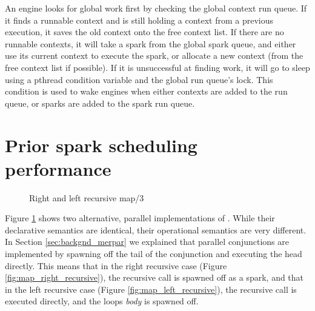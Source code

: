 An engine looks for global work first by checking the global context run queue.
If it finds a runnable context and is still holding a context from a
previous execution, it saves the old context onto the free context list.
If there are no runnable contexts,
it will take a spark from the global spark queue,
and either use its current context to execute the spark,
or allocate a new context (from the free context list if possible).
If it is unsuccessful at finding work,
it will go to sleep using a pthread condition variable and the global run
queue's lock.
This condition is used to wake engines when either contexts are added to the
run queue,
or sparks are added to the spark run queue.

\section{Prior spark scheduling performance}
\label{sec:old_scheduling_performance}


\begin{figure}
\begin{center}
%
\end{center}
\caption{Right and left recursive map/3}
\label{fig:map_right_and_left_recursive}
\end{figure}

Figure \ref{fig:map_right_and_left_recursive} shows two alternative, parallel
implementations of .
While their declarative semantics are identical,
their operational semantics are very different.  In Section
\ref{sec:backgnd_merpar} we explained that parallel conjunctions are
implemented by spawning off the tail of the conjunction and executing the
head directly.
This means that in the right recursive case (Figure
\ref{fig:map_right_recursive}), the recursive call is spawned off as a
spark,
and that in the left recursive case (Figure \ref{fig:map_left_recursive}),
the recursive call is executed directly, and the loops \emph{body} is
spawned off.

